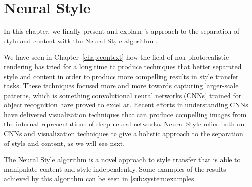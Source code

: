 
\chapter{Neural Style}
\label{chap:system}




In this chapter, we finally present and explain \citeauthor{Gatys2015B}'s approach to the separation of style and content with the Neural Style algorithm \cite{Gatys2015B}.

We have seen in Chapter~\ref{chap:context} how the field of non-photorealistic rendering has tried for a long time to produce techniques that better separated style and content in order to produce more compelling results in style transfer tasks.
These techniques focused more and more towards capturing larger-scale patterns, which is something convolutional neural networks (CNNs) trained for object recognition have proved to excel at.
Recent efforts in understanding CNNs have delivered visualization techniques that can produce compelling images from the internal representations of deep neural networks.
Neural Style relies both on CNNs and visualization techniques to give a holistic approach to the separation of style and content, as we will see next.

The Neural Style algorithm is a novel approach to style transfer that is able to manipulate content and style independently.
Some examples of the results achieved by this algorithm can be seen in \autoref{sub:system:examples}.

